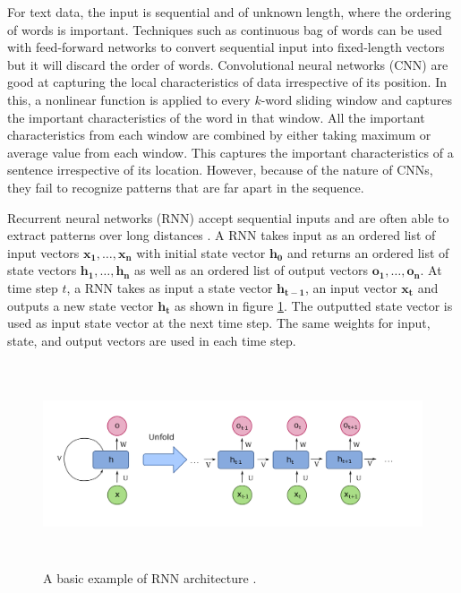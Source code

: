 \documentclass[a4paper, 11pt]{article}
\begin{document}
For text data, the input is sequential and of unknown length, where the ordering of words is important. Techniques such as continuous bag of words \parencite{DBLP:journals/corr/abs-1301-3781} can be used with feed-forward networks to convert sequential input into fixed-length vectors but it will discard the order of words. Convolutional neural networks (CNN) \parencite{Bengio1997} are good at capturing the local characteristics of data irrespective of its position. In this, a nonlinear function is applied to every $k$-word sliding window and captures the important characteristics of the word in that window. All the important characteristics from each window are combined by either taking maximum or average value from each window. This captures the important characteristics of a sentence irrespective of its location. However, because of the nature of CNNs, they fail to recognize patterns that are far apart in the sequence.

Recurrent neural networks (RNN) accept sequential inputs and are often able to extract patterns over long distances \parencite{Elman}. A RNN takes input as an ordered list of input vectors $\mathrm{\mathbf{x_1},\dots,\mathbf{x_n}}$ with initial state vector $\mathbf{h_0}$ and returns an ordered list of state vectors $\mathrm{\mathbf{h_1},\dots,\mathbf{h_n}}$ as well as an ordered list of output vectors $\mathrm{\mathbf{o_1},\dots,\mathbf{o_n}}$. At time step $t$, a RNN takes as input a state vector $\mathbf{h_{t-1}}$, an input vector $\mathbf{x_{t}}$ and outputs a new state vector $\mathbf{h_{t}}$ as shown in figure \ref{fig:A basic RNN architecture}. The outputted state vector is used as input state vector at the next time step. The same weights for input, state, and output vectors are used in each time step.  


\begin{figure}[htpb!]
    \centering
    \includegraphics[width=\textwidth,height=6cm,keepaspectratio=true]
    {Recurrent_neural_network_unfold.png}
    \caption{
        A basic example of RNN architecture \parencite{rnn-1}.
    }
    \label{fig:A basic RNN architecture}
\end{figure}
\end{document}
